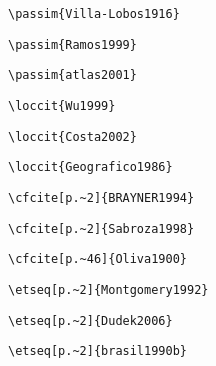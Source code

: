 \begin{alineas}
\begin{verbatim}
\passim{Villa-Lobos1916}
\end{verbatim}

\begin{verbatim}
\passim{Ramos1999}
\end{verbatim}

\begin{verbatim}
\passim{atlas2001}
\end{verbatim}

\begin{verbatim}
\loccit{Wu1999}
\end{verbatim}

\begin{verbatim}
\loccit{Costa2002}
\end{verbatim}

\begin{verbatim}
\loccit{Geografico1986}
\end{verbatim}

\begin{verbatim}
\cfcite[p.~2]{BRAYNER1994}
\end{verbatim}

\begin{verbatim}
\cfcite[p.~2]{Sabroza1998}
\end{verbatim}

\begin{verbatim}
\cfcite[p.~46]{Oliva1900}
\end{verbatim}

\begin{verbatim}
\etseq[p.~2]{Montgomery1992}
\end{verbatim}

\begin{verbatim}
\etseq[p.~2]{Dudek2006}
\end{verbatim}

\begin{verbatim}
\etseq[p.~2]{brasil1990b}
\end{verbatim}

\end{alineas}


